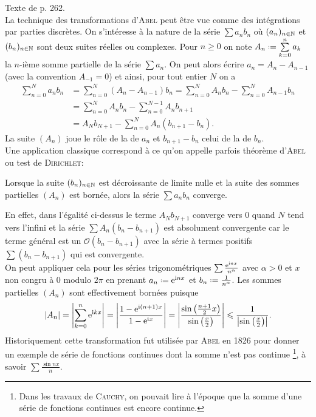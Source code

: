 Texte de \cite{oraux_x_ens_3} p. 262. \\

La technique des transformations d'\textsc{Abel} peut être vue comme des intégrations par parties discrètes. On s'intéresse à la nature de la série $\sum a_n b_n$ où $(a_n)_{n \in \mathbb{N}}$ et $(b_n)_{n \in \mathbb{N}}$ sont deux suites réelles ou complexes. Pour $n \geqslant 0$ on note $A_n \defeq \sum\limits_{k=0}^n a_k$ la $n$-ième somme partielle de la série $\sum a_n$. On peut alors écrire $a_n = A_n - A_{n-1}$ (avec la convention $A_{-1} = 0$) et ainsi, pour tout entier $N$ on a
\begin{align*}
    \sum_{n=0}^N a_n b_n &= \sum_{n=0}^N (A_n - A_{n-1})b_n =  \sum_{n=0}^N A_n b_n -  \sum_{n=0}^N A_{n-1}b_n \\
    &= \sum_{n=0}^N A_n b_n - \sum_{n=0}^{N-1} A_n b_{n+1} \\
    &= A_N b_{N+1} - \sum_{n=0}^N A_n(b_{n+1}-b_n).
\end{align*}
La suite $(A_n)$ joue le rôle de la  de $a_n$ et $b_{n+1} - b_n$ celui de la  de $b_n$. \\
Une application classique correspond à ce qu'on appelle parfois théorème d'\textsc{Abel} ou test de \textsc{Dirichlet}: 
\begin{theo}
    Lorsque la suite $(b_n)_{n \in \mathbb{N}}$ est décroissante de limite nulle et la suite des sommes partielles $(A_n)$ est bornée, alors la série $\sum a_n b_n$ converge. 
\end{theo}

En effet, dans l'égalité ci-dessus le terme $A_N b_{N+1}$ converge vers $0$ quand $N$ tend vers l'infini et la série $\sum A_n(b_n - b_{n+1})$ est absolument convergente car le terme général est un $\mathcal{O}(b_n - b_{n+1})$ avec la série à termes positifs $\sum(b_n - b_{n+1})$ qui est convergente. \\
On peut appliquer cela pour les séries trigonométriques $\sum \frac{\mathrm{e}^{\mathrm{i} n x}}{n^\alpha}$ avec $\alpha > 0$ et $x$ non congru à $0$ modulo $2 \pi$ en prenant $a_n \defeq \me^{\mi n x}$ et $b_n \defeq \frac{1}{n^\alpha}$. Les sommes partielles $(A_n)$ sont effectivement bornées puisque
$$|A_n| = \left| \sum_{k=0}^n \mathrm{e}^{\mathrm{i} k x}\right| = \left| \frac{1 - \mathrm{e}^{\mathrm{i} (n+1)x}}{1-\mathrm{e}^{\mathrm{i} x}} \right| = \left| \frac{\sin \left( \frac{n+1}{2} x\right)}{\sin \left( \frac{x}{2} \right)} \right| \leqslant \frac{1}{\left| \sin \left( \frac{x}{2} \right) \right|}.$$
Historiquement cette transformation fut utilisée par \textsc{Abel} en 1826 pour donner un exemple de série de fonctions continues dont la somme n'est pas continue \footnote{Dans les travaux de \textsc{Cauchy}, on pouvait lire à l'époque que la somme d'une série de fonctions continues est encore continue.}, à savoir $\sum \frac{\sin nx}{n}$.
